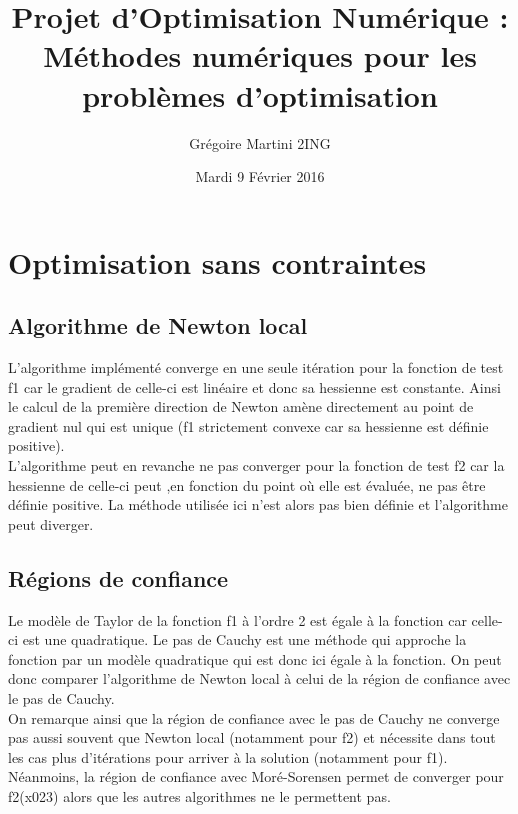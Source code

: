 \documentclass[a4paper,12pt]{article}
\title{Projet d'Optimisation Numérique : \\ \smallskip \Large Méthodes numériques pour les problèmes d'optimisation \\ \bigskip}
\author{Grégoire Martini 2ING}
\date{Mardi 9 Février 2016}
\begin{document}
\maketitle
\tableofcontents
\newpage

\section{Optimisation sans contraintes}

\subsection{Algorithme de Newton local}

L'algorithme implémenté converge en une seule itération pour la fonction de test f1 car le gradient de celle-ci est linéaire et donc sa hessienne est constante. Ainsi le calcul de la première direction de Newton amène directement au point de gradient nul qui est unique (f1 strictement convexe car sa hessienne est définie positive).\\

L'algorithme peut en revanche ne pas converger pour la fonction de test f2 car la hessienne de celle-ci peut ,en fonction du point où elle est évaluée, ne pas être définie positive. La méthode utilisée ici n'est alors pas bien définie et l'algorithme peut diverger.\\


\subsection{Régions de confiance}

Le modèle de Taylor de la fonction f1 à l'ordre 2 est égale à la fonction car celle-ci est une quadratique. Le pas de Cauchy est une méthode qui approche la fonction par un modèle quadratique qui est donc ici égale à la fonction. On peut donc comparer l'algorithme de Newton local à celui de la région de confiance avec le pas de Cauchy. \\

On remarque ainsi que la région de confiance avec le pas de Cauchy ne converge pas aussi souvent que Newton local (notamment pour f2) et nécessite dans tout les cas plus d'itérations pour arriver à la solution (notamment pour f1). 
Néanmoins, la région de confiance avec Moré-Sorensen permet de converger pour f2(x023) alors que les autres algorithmes ne le permettent pas. \\
\end{document}
